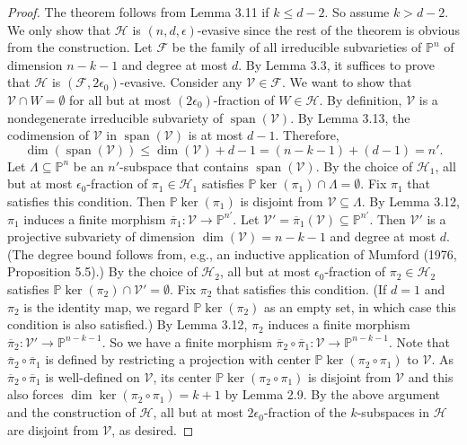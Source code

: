 \documentclass[10pt,a4paper]{article}
\newcommand{\PP}{\mathbb P}
\begin{document}
\begin{proof}
The theorem follows from Lemma 3.11 if $k\le d-2$. So assume $k>d-2$. We only show that $\mathcal H$ is $(n,d,\epsilon)$-evasive since the rest of the theorem is obvious from the construction.
Let $\mathcal F$ be the family of all irreducible subvarieties of $\PP^n$ of dimension $n-k-1$ and degree at most $d$. By Lemma 3.3, it suffices to prove that $\mathcal H$ is $(\mathcal F,2\epsilon_0)$-evasive. Consider any $\mathcal V\in\mathcal F$. We want to show that $\mathcal V\cap W=\emptyset$ for all but at most $(2\epsilon_0)$-fraction of $W\in\mathcal H$.
By definition, $\mathcal V$ is a nondegenerate irreducible subvariety of $\operatorname{span}(\mathcal V)$. By Lemma 3.13, the codimension of $\mathcal V$ in $\operatorname{span}(\mathcal V)$ is at most $d-1$. Therefore,
\[\dim(\operatorname{span}(\mathcal V))\le\dim(\mathcal V)+d-1=(n-k-1)+(d-1)=n'.\]
Let $\Lambda\subseteq\PP^n$ be an $n'$-subspace that contains $\operatorname{span}(\mathcal V)$. By the choice of $\mathcal H_1$, all but at most $\epsilon_0$-fraction of $\pi_1\in\mathcal H_1$ satisfies $\PP\ker(\pi_1)\cap\Lambda=\emptyset$. Fix $\pi_1$ that satisfies this condition. Then $\PP\ker(\pi_1)$ is disjoint from $\mathcal V\subseteq\Lambda$. By Lemma 3.12, $\pi_1$ induces a finite morphism $\overline\pi_1:\mathcal V\to\PP^{n'}$.
Let $\mathcal V'=\overline\pi_1(\mathcal V)\subseteq\PP^{n'}$. Then $\mathcal V'$ is a projective subvariety of dimension $\dim(\mathcal V)=n-k-1$ and degree at most $d$. (The degree bound follows from, e.g., an inductive application of Mumford (1976, Proposition 5.5).) By the choice of $\mathcal H_2$, all but at most $\epsilon_0$-fraction of $\pi_2\in\mathcal H_2$ satisfies $\PP\ker(\pi_2)\cap\mathcal V'=\emptyset$. Fix $\pi_2$ that satisfies this condition. (If $d=1$ and $\pi_2$ is the identity map, we regard $\PP\ker(\pi_2)$ as an empty set, in which case this condition is also satisfied.) By Lemma 3.12, $\pi_2$ induces a finite morphism $\overline\pi_2:\mathcal V'\to\PP^{n-k-1}$. So we have a finite morphism $\overline\pi_2\circ\overline\pi_1:\mathcal V\to\PP^{n-k-1}$. Note that $\overline\pi_2\circ\overline\pi_1$ is defined by restricting a projection with center $\PP\ker(\pi_2\circ\pi_1)$ to $\mathcal V$. As $\overline\pi_2\circ\overline\pi_1$ is well-defined on $\mathcal V$, its center $\PP\ker(\pi_2\circ\pi_1)$ is disjoint from $\mathcal V$ and this also forces $\dim\ker(\pi_2\circ\pi_1)=k+1$ by Lemma 2.9.
By the above argument and the construction of $\mathcal H$, all but at most $2\epsilon_0$-fraction of the $k$-subspaces in $\mathcal H$ are disjoint from $\mathcal V$, as desired.
\end{proof}
\end{document}
